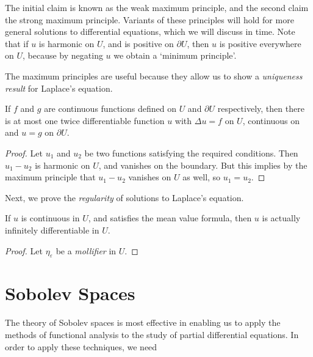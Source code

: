 The initial claim is known as the weak maximum principle, and the second claim the strong maximum principle. Variants of these principles will hold for more general solutions to differential equations, which we will discuss in time. Note that if $u$ is harmonic on $U$, and is positive on $\partial U$, then $u$ is positive everywhere on $U$, because by negating $u$ we obtain a `minimum principle'.

The maximum principles are useful because they allow us to show a {\it uniqueness result} for Laplace's equation.

\begin{theorem}
    If $f$ and $g$ are continuous functions defined on $U$ and $\partial U$ respectively, then there is at most one twice differentiable function $u$ with $\Delta u = f$ on $U$, continuous on  and $u = g$ on $\partial U$.
\end{theorem}
\begin{proof}
    Let $u_1$ and $u_2$ be two functions satisfying the required conditions. Then $u_1 - u_2$ is harmonic on $U$, and vanishes on the boundary. But this implies by the maximum principle that $u_1 - u_2$ vanishes on $U$ as well, so $u_1 = u_2$.
\end{proof}

Next, we prove the {\it regularity} of solutions to Laplace's equation.

\begin{theorem}
    If $u$ is continuous in $U$, and satisfies the mean value formula, then $u$ is actually infinitely differentiable in $U$.
\end{theorem}
\begin{proof}
    Let $\eta_\varepsilon$ be a {\it mollifier} in $U$. 
\end{proof}









\chapter{Sobolev Spaces}

The theory of Sobolev spaces is most effective in enabling us to apply the methods of functional analysis to the study of partial differential equations. In order to apply these techniques, we need 




